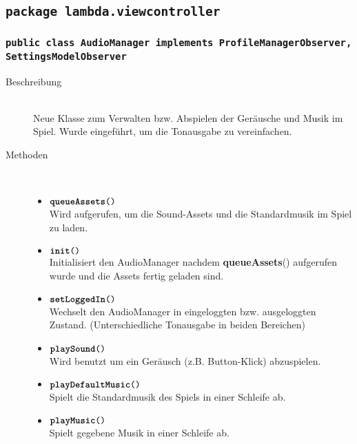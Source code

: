 \subsection{\texttt{package lambda.viewcontroller}}

\subsubsection{\normalfont \texttt{public class \textbf{AudioManager} implements ProfileManagerObserver, SettingsModelObserver}}

\begin{description}
\item[Beschreibung] \hfill \\ Neue Klasse zum Verwalten bzw. Abspielen der Geräusche und Musik im Spiel. Wurde eingeführt, um die Tonausgabe zu vereinfachen.
	
\item[Methoden] \hfill \\
	\vspace{-.8cm}
	\begin{itemize}
		\item $\texttt{\textbf{queueAssets}()}$ \\ Wird aufgerufen, um die Sound-Assets und die Standardmusik im Spiel zu laden.
		
		\item $\texttt{\textbf{init}()}$ \\ Initialisiert den AudioManager nachdem \textbf{queueAssets}() aufgerufen wurde und die Assets fertig geladen sind.
				
		\item $\texttt{\textbf{setLoggedIn}()}$ \\ Wechselt den AudioManager in eingeloggten bzw. ausgeloggten Zustand. (Unterschiedliche Tonausgabe in beiden Bereichen)
		
		\item $\texttt{\textbf{playSound}()}$ \\ Wird benutzt um ein Geräusch (z.B. Button-Klick) abzuspielen.
	
		\item $\texttt{\textbf{playDefaultMusic}()}$ \\ Spielt die Standardmusik des Spiels in einer Schleife ab.
	
		\item $\texttt{\textbf{playMusic}()}$ \\ Spielt gegebene Musik in einer Schleife ab.
	\end{itemize}
\end{description}
